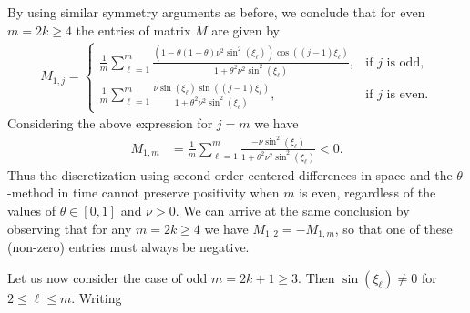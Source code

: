 \documentclass[smallextended,numbook,runningheads]{svjour3}     %
\newtheorem{remark}{Remark}
\newtheorem{remark}{Remark}
\newcommand{\te}{\theta}
\begin{document}
\begin{description}[style=unboxed,leftmargin=0cm]
\item [{Case 1:} $m$ is {even}.]
\item \noindent By using similar symmetry arguments as before, we conclude that for {even} $m=2k\ge 4$
the entries of matrix $M$ are given by
\begin{align*}
	M_{1,j} = \begin{cases}
				\displaystyle
				\frac{1}{m} \sum_{\ell=1}^{m}\frac{\left(1-\theta(1-\theta)\nu^2\sin^2(\xi_\ell)
					\right)\cos((j-1)\xi_\ell)}{1+\theta^2\nu^2\sin^2(\xi_\ell)}, &\mbox{if } j
					\text{ is odd}, \\[20pt]
				\displaystyle
				\frac{1}{m} \sum_{\ell=1}^{m} \frac{\nu \sin(\xi_\ell)\sin((j-1)\xi_\ell)}
					{1+\theta^2\nu^2 \sin^2 (\xi_\ell)}, &\mbox{if } j \text{ is even}.
			  \end{cases}
\end{align*}
Considering  the above expression for $j = m$ we have
\begin{align*}
    M_{1,m} & =  \frac{1}{m} \sum_{\ell=1}^{m} \frac{- \nu \sin^2 (\xi_\ell)}{1+\theta^2\nu^2 \sin^2 (\xi_\ell)} < 0.
\end{align*}
Thus the discretization using second-order centered differences in space and the $\theta$-method in time cannot preserve positivity when $m$ is even, regardless of the
values of $\theta\in[0,1]$ and $\nu>0$.
We can arrive at the same conclusion by observing that
for any $m=2k\ge 4$ we have $M_{1,2}=-M_{1,m}$, so that one of
these (non-zero) entries must always be negative.
\item [{Case 2:} $m$ is {odd}.]
\item \noindent Let us now consider the case of {odd} $m=2k+1\ge 3$. Then $\sin(\xi_\ell)\ne0$ for
$2\le\ell\le m$.
Writing

\end{description}
\end{document}
